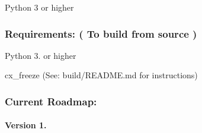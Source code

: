 \begin{DoxyItemize}
\item Python 3 or higher
\end{DoxyItemize}

\subsubsection*{Requirements\+: ( To build from source )}


\begin{DoxyItemize}
\item Python 3. or higher
\item cx\+\_\+freeze (See\+: build/\+R\+E\+A\+D\+M\+E.\+md for instructions)
\end{DoxyItemize}

\subsubsection*{Current Roadmap\+:}

\paragraph*{Version 1.}


